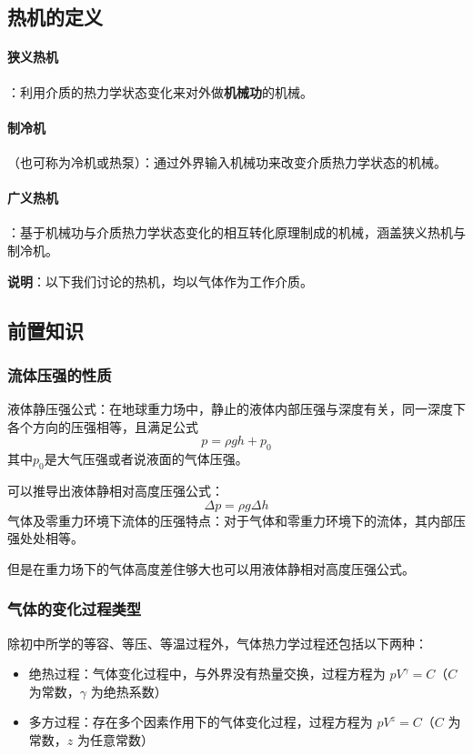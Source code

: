 \documentclass{article}
\begin{document}
	\subsection{热机的定义}
	\paragraph{狭义热机}：利用介质的热力学状态变化来对外做\textbf{机械功}的机械。
	\paragraph{制冷机}（也可称为冷机或热泵）：通过外界输入机械功来改变介质热力学状态的机械。
	\paragraph{广义热机}：基于机械功与介质热力学状态变化的相互转化原理制成的机械，涵盖狭义热机与制冷机。
	
	\textbf{说明}：以下我们讨论的热机，均以气体作为工作介质。
	
	\subsection{前置知识}
	
	\subsubsection{流体压强的性质}
	
	液体静压强公式：在地球重力场中，静止的液体内部压强与深度有关，同一深度下各个方向的压强相等，且满足公式
	\[
	p=\rho gh + p_0
	\]
	其中$p_0$是大气压强或者说液面的气体压强。
	
	可以推导出液体静相对高度压强公式：
	\[
	\Delta p=\rho g \Delta h
	\]
	气体及零重力环境下流体的压强特点：对于气体和零重力环境下的流体，其内部压强处处相等。
	
	但是在重力场下的气体高度差住够大也可以用液体静相对高度压强公式。

	\subsubsection{气体的变化过程类型}
	除初中所学的等容、等压、等温过程外，气体热力学过程还包括以下两种：
	\begin{itemize}[leftmargin=2em]
		\item 绝热过程：气体变化过程中，与外界没有热量交换，过程方程为 $pV^\gamma = C$（$C$ 为常数，$\gamma$ 为绝热系数）
		\item 多方过程：存在多个因素作用下的气体变化过程，过程方程为 $pV^z = C$（$C$ 为常数，$z$ 为任意常数）
	\end{itemize}
	
\end{document}

